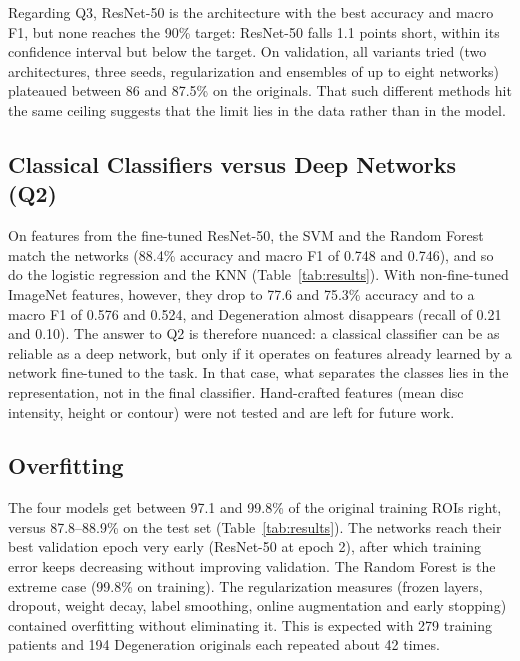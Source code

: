 Regarding Q3, ResNet-50 is the architecture with the best accuracy and macro F1, but none reaches the 90\% target: ResNet-50 falls 1.1 points short, within its confidence interval but below the target. On validation, all variants tried (two architectures, three seeds, regularization and ensembles of up to eight networks) plateaued between 86 and 87.5\% on the originals. That such different methods hit the same ceiling suggests that the limit lies in the data rather than in the model.

\subsection{Classical Classifiers versus Deep Networks (Q2)}
\label{sec:res_q2}
On features from the fine-tuned ResNet-50, the SVM and the Random Forest match the networks (88.4\% accuracy and macro F1 of 0.748 and 0.746), and so do the logistic regression and the KNN (Table~\ref{tab:results}). With non-fine-tuned ImageNet features, however, they drop to 77.6 and 75.3\% accuracy and to a macro F1 of 0.576 and 0.524, and Degeneration almost disappears (recall of 0.21 and 0.10). The answer to Q2 is therefore nuanced: a classical classifier can be as reliable as a deep network, but only if it operates on features already learned by a network fine-tuned to the task. In that case, what separates the classes lies in the representation, not in the final classifier. Hand-crafted features (mean disc intensity, height or contour) were not tested and are left for future work.

\subsection{Overfitting}
\label{sec:res_overfitting}
The four models get between 97.1 and 99.8\% of the original training ROIs right, versus 87.8--88.9\% on the test set (Table~\ref{tab:results}). The networks reach their best validation epoch very early (ResNet-50 at epoch 2), after which training error keeps decreasing without improving validation. The Random Forest is the extreme case (99.8\% on training). The regularization measures (frozen layers, dropout, weight decay, label smoothing, online augmentation and early stopping) contained overfitting without eliminating it. This is expected with 279 training patients and 194 Degeneration originals each repeated about 42 times.

